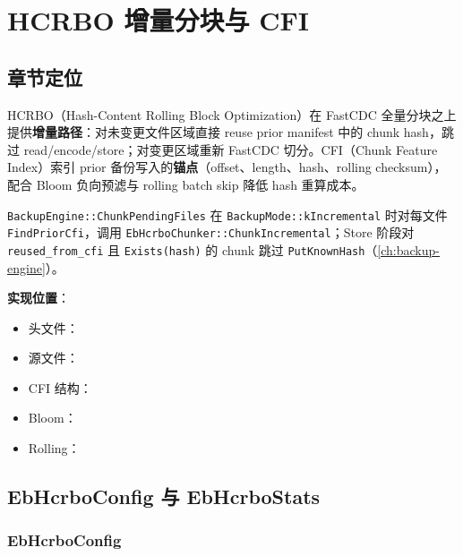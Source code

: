 \chapter{HCRBO 增量分块与 CFI}
\label{ch:chunk-hcrbo}

\section{章节定位}

HCRBO（Hash-Content Rolling Block Optimization）在 FastCDC 全量分块之上提供\textbf{增量路径}：对未变更文件区域直接 reuse  prior manifest 中的 chunk hash，跳过 read/encode/store；对变更区域重新 FastCDC 切分。CFI（Chunk Feature Index）索引 prior 备份写入的\textbf{锚点}（offset、length、hash、rolling checksum），配合 Bloom 负向预滤与 rolling batch skip 降低 hash 重算成本。

\begin{designbox}
\texttt{BackupEngine::ChunkPendingFiles} 在 \texttt{BackupMode::kIncremental} 时对每文件 \texttt{FindPriorCfi}，调用 \texttt{EbHcrboChunker::ChunkIncremental}；Store 阶段对 \texttt{reused\_from\_cfi} 且 \texttt{Exists(hash)} 的 chunk 跳过 \texttt{PutKnownHash}（\cref{ch:backup-engine}）。
\end{designbox}

\textbf{实现位置}：
\begin{itemize}[nosep]
  \item 头文件：
  \item 源文件：
  \item CFI 结构：
  \item Bloom：
  \item Rolling：
\end{itemize}

\section{EbHcrboConfig 与 EbHcrboStats}
\label{sec:hcrbo-config-stats}

\subsection{EbHcrboConfig}

